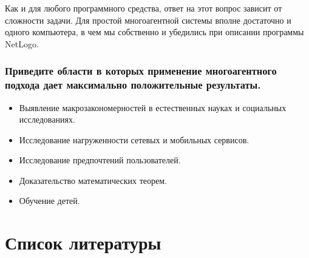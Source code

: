 \documentclass[14pt,a4paper,report]{report}
\begin{document}
Как и для любого программного средства, ответ на этот вопрос зависит от сложности задачи. Для простой многоагентной системы вполне достаточно и одного компьютера, в чем мы собственно и убедились при описании программы NetLogo.

\subsubsection{Приведите области в которых применение многоагентного подхода дает максимально положительные результаты.}

\begin{itemize}
	\item Выявление макрозакономерностей в естественных науках и социальных исследованиях.
	\item Исследование нагруженности сетевых и мобильных сервисов.
	\item Исследование предпочтений пользователей.
	\item Доказательство математических теорем.
	\item Обучение детей.
\end{itemize}

\clearpage

\section{Список литературы}
\end{document}
